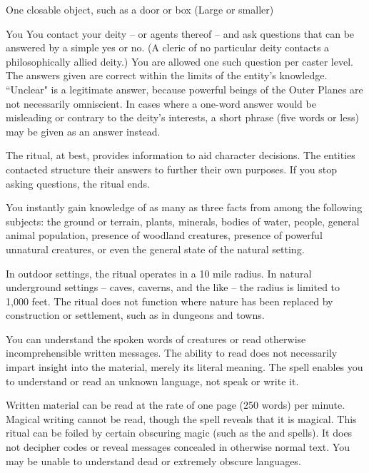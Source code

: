 \begin{spelltarget}{One closable object, such as a door or box (Large or smaller)}
\begin{spelltarget}{You}
\spelldur{\durmed}
\spelleffect You contact your deity -- or agents thereof -- and ask questions that can be answered by a simple yes or no. (A cleric of no particular deity contacts a philosophically allied deity.) You are allowed one such question per caster level. The answers given are correct within the limits of the entity's knowledge. ``Unclear" is a legitimate answer, because powerful beings of the Outer Planes are not necessarily omniscient. In cases where a one-word answer would be misleading or contrary to the deity's interests, a short phrase (five words or less) may be given as an answer instead.
\par The ritual, at best, provides information to aid character decisions. The entities contacted structure their answers to further their own purposes. If you stop asking questions, the ritual ends.

\spelleffect You instantly gain knowledge of as many as three facts from among the following subjects: the ground or terrain, plants, minerals, bodies of water, people, general animal population, presence of woodland creatures, presence of powerful unnatural creatures, or even the general state of the natural setting.
\par In outdoor settings, the ritual operates in a 10 mile radius. In natural underground settings -- caves, caverns, and the like -- the radius is limited to 1,000 feet. The ritual does not function where nature has been replaced by construction or settlement, such as in dungeons and towns.

\spelldur{\durlong}
\spelleffect You can understand the spoken words of creatures or read otherwise incomprehensible written messages. The ability to read does not necessarily impart insight into the material, merely its literal meaning. The spell enables you to understand or read an unknown language, not speak or write it.
\par Written material can be read at the rate of one page (250 words) per minute. Magical writing cannot be read, though the spell reveals that it is magical. 
\spellnotes This ritual can be foiled by certain obscuring magic (such as the  and  spells). It does not decipher codes or reveal messages concealed in otherwise normal text. You may be unable to understand dead or extremely obscure languages.


\end{spelltarget}
\end{spelltarget}
